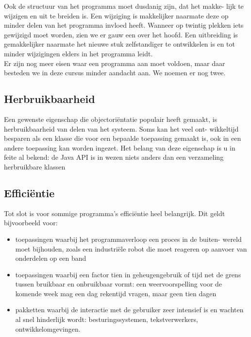 \documentclass{article}
\begin{document}
	Ook de structuur van het programma moet dusdanig zijn, dat het makke-
	lijk te wijzigen en uit te breiden is. Een wijziging is makkelijker naarmate
	deze op minder delen van het programma invloed heeft. Wanneer op
	twintig plekken iets gewijzigd moet worden, zien we er gauw een over
	het hoofd. Een uitbreiding is gemakkelijker naarmate het nieuwe stuk
	zelfstandiger te ontwikkelen is en tot minder wijzigingen elders in het
	programma leidt. \\
	Er zijn nog meer eisen waar een programma aan moet voldoen, maar
	daar besteden we in deze cursus minder aandacht aan. We noemen er
	nog twee. \\
	\subsection{Herbruikbaarheid}
	
	Een gewenste eigenschap die objectori\"{e}ntatie populair heeft gemaakt,
	is herbruikbaarheid van delen van het systeem. Soms kan het veel ont-
	wikkeltijd besparen als een klasse die voor een bepaalde toepassing
	gemaakt is, ook in een andere toepassing kan worden ingezet. Het
	belang van deze eigenschap is u in feite al bekend: de Java API is in
	wezen niets anders dan een verzameling herbruikbare klassen	
	
	\subsection{Effici\"{e}ntie}
	
	Tot slot is voor sommige programma’s efficiëntie heel belangrijk. Dit geldt
	bijvoorbeeld voor:
	\begin{itemize}
		\item toepassingen waarbij het programmaverloop een proces in de buiten-
		wereld moet bijhouden, zoals een industriële robot die moet reageren op
		aanvoer van onderdelen op een band
		\item toepassingen waarbij een factor tien in geheugengebruik of tijd net de
		grens tussen bruikbaar en onbruikbaar vormt: een weervoorspelling voor
		de komende week mag een dag rekentijd vragen, maar geen tien dagen
		\item pakketten waarbij de interactie met de gebruiker zeer intensief is en
		wachten al snel hinderlijk wordt: besturingssystemen, tekstverwerkers,
		ontwikkelomgevingen.
	\end{itemize}
\end{document}
